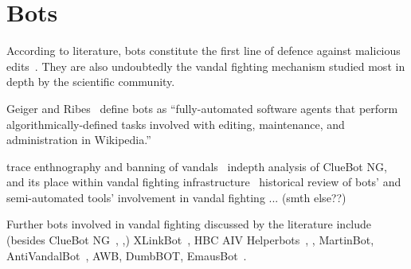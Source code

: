 \begin{comment}
https://quarry.wmflabs.org/query/20704
Percent of bot edits in previous month (enwiki, articles only)
\begin{verbatim}
is_bot	edits	Percentage of all edits
0	    4273810	80.2025
1	    1054966	19.7975
\end{verbatim}

However, a month is a relatively small period and you can't make an argument about general trends based on it.
For instance, these same quarries ran on April 12, 2019 render following results:
https://quarry.wmflabs.org/query/35104
Percent of bot edits in previous month (enwiki, all pages)
\begin{verbatim}
is_bot	edits	Percentage of all edits
0	    6710916	89.7318
1	    767948	10.2682
\end{verbatim}

https://quarry.wmflabs.org/query/35105
Percent of bot edits in previous month (enwiki, articles only)
\begin{verbatim}
is_bot	edits	Percentage of all edits
0	    3426624	92.1408
1	    292274	7.8592
\end{verbatim}
\end{comment}


\section{Bots}

According to literature, bots constitute the first line of defence against malicious edits~\cite{GeiHal2013}. %
They are also undoubtedly the vandal fighting mechanism studied most in depth by the scientific community. %

Geiger and Ribes~\cite{GeiRib2010} define bots as
``fully-automated software
agents that perform algorithmically-defined tasks involved
with editing, maintenance, and administration in Wikipedia.''

trace enthnography and banning of vandals~\cite{GeiRib2010}
indepth analysis of ClueBot NG, and its place within vandal fighting infrastructure~\cite{GeiHal2013}
historical review of bots' and semi-automated tools' involvement in vandal fighting\cite{HalRied2012}
... (smth else??)

Further bots involved in vandal fighting discussed by the literature include (besides ClueBot NG~\cite{GeiHal2013}, \cite{HalRied2012},)
XLinkBot~\cite{HalRied2012},
HBC AIV Helperbots~\cite{HalRied2012}, \cite{GeiRib2010},
MartinBot, AntiVandalBot~\cite{HalRied2012},
AWB, DumbBOT, EmausBot~\cite{GeiHal2013}.


